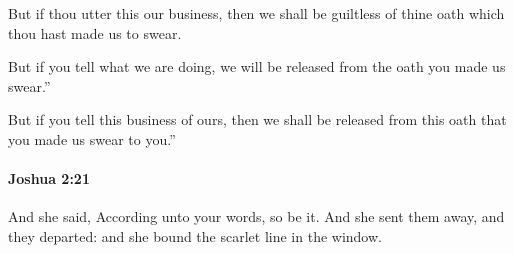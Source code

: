 			\begin{versebox}
					\item[BHS] 
					\item[ASV] But if thou utter this our business, then we shall be guiltless of thine oath which thou hast made us to swear.
					\item[NIV] But if you tell what we are doing, we will be released from the oath you made us swear.”
					\item[NRSV] But if you tell this business of ours, then we shall be released from this oath that you made us swear to you.”
			\end{versebox}

		\paragraph{Joshua 2:21} %
			\label{JOSHUA-2-21}

			And she said, According unto your words, so be it. And she sent them away, and they departed: and she bound the scarlet line in the window.

